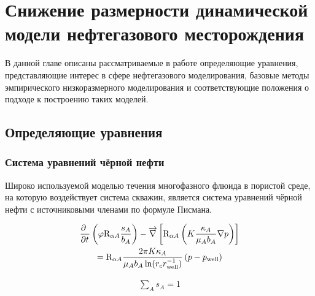 \chapter{Снижение размерности динамической модели нефтегазового месторождения}\label{ch:ch2}


\newcommand{\bvec}[1]{\mathbf{#1}}
\newcommand{\resid}{\bvec{r}}
\newcommand{\unk}{\bvec{u}}
\newcommand{\jac}{\mathrm{J}}
\newcommand{\dunk}{\Delta \unk}
\newcommand{\vunk}{\bvec{v}}
\newcommand{\matr}[1]{\mathrm{\uppercase{#1}}}
\newcommand{\norm}[2][~]{\left\| #2  \right\|_{#1}}
\newcommand{\transpose}[1]{\matr{#1}^\mathrm{T}}
\newcommand{\dvunk}{\Delta \vunk}
\newcommand{\deriv}[3][]{\frac{\partial^{#1} #2}{\partial #3^{#1}}}
\newcommand{\pc}[1][~]{\bvec{\varphi}_{#1}}
\newcommand{\param}{\bvec{\mu}}
\newcommand{\nlin}{\bvec{\eta}}

В данной главе описаны рассматриваемые в работе определяющие уравнения, представляющие интерес в сфере нефтегазового моделирования, базовые методы эмпирического низкоразмерного моделирования и соответствующие положения о подходе к построению таких моделей.

\section{Определяющие уравнения}

\subsection{Система уравнений чёрной нефти}

Широко используемой моделью течения многофазного флюида в пористой среде, на которую воздействует система скважин, является система уравнений чёрной нефти  с источниковыми членами по формуле Писмана.

\begin{multline}
    \label{eq:blackoil}
    \deriv{~}{t}\left(
        \varphi \matr{R}_{\alpha A} \frac{s_A}{b_A}
    \right) - \overrightarrow{\nabla} \left[
        \matr{R}_{\alpha A} \left(
            K\frac{\kappa_A}{\mu_A b_A}\nabla p
        \right)
    \right] \\
    = \matr{R}_{\alpha A}
    \frac{2\pi K \kappa_A}{\mu_A b_A \ln(r_c r_\text{well}^{-1})}
    \left(p - p_\text{well}\right)
\end{multline}

\begin{align}
    \label{eq:sats}
    \sum_A s_A = 1
\end{align}

